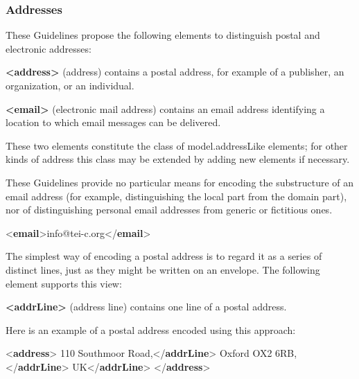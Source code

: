 \subsubsection[{Addresses}]{Addresses}\label{CONAAD}\par
These Guidelines propose the following elements to distinguish postal and electronic addresses: 
\begin{sansreflist}
  
\item [\textbf{<address>}] (address) contains a postal address, for example of a publisher, an organization, or an individual.
\item [\textbf{<email>}] (electronic mail address) contains an email address identifying a location to which email messages can be delivered.
\end{sansreflist}
 These two elements constitute the class of \textsf{model.addressLike} elements; for other kinds of address this class may be extended by adding new elements if necessary.\par
These Guidelines provide no particular means for encoding the substructure of an email address (for example, distinguishing the local part from the domain part), nor of distinguishing personal email addresses from generic or fictitious ones. \par\bgroup{}\exampleFont \begin{shaded}\noindent\mbox{}{<\textbf{email}>}info@tei-c.org{</\textbf{email}>}\end{shaded}\egroup\par \par
The simplest way of encoding a postal address is to regard it as a series of distinct lines, just as they might be written on an envelope. The following element supports this view: 
\begin{sansreflist}
  
\item [\textbf{<addrLine>}] (address line) contains one line of a postal address.
\end{sansreflist}
 Here is an example of a postal address encoded using this approach: \par\bgroup{}\exampleFont \begin{shaded}\noindent\mbox{}{<\textbf{address}>}\mbox{}\newline 
{}110 Southmoor Road,{</\textbf{addrLine}>}\mbox{}\newline 
{}Oxford OX2 6RB,{</\textbf{addrLine}>}\mbox{}\newline 
{}UK{</\textbf{addrLine}>}\mbox{}\newline 
{</\textbf{address}>}\end{shaded}\egroup\par \par
